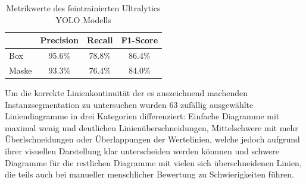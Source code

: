 \begin{table}[H]
    \centering
    \begin{tabular}{|l|c|c|c|}
        \hline
        \rowcolor[HTML]{EFEFEF}
              & Precision & Recall & F1-Score \\ \hline
        Box   & 95.6\%    & 78.8\% & 86.4\%   \\ \hline
        Maske & 93.3\%    & 76.4\% & 84.0\%   \\ \hline
    \end{tabular}
    \caption{Metrikwerte des feintrainierten Ultralytics YOLO Modells}
\end{table}

Um die korrekte Linienkontinuität der es auszeichnend machenden Instanzsegmentation zu untersuchen wurden 63 zufällig ausgewählte Liniendiagramme in drei Kategorien differenziert: Einfache Diagramme mit maximal wenig und deutlichen Linienüberschneidungen, Mittelschwere mit mehr Überlschneidungen oder Überlappungen der Wertelinien, welche jedoch aufgrund ihrer visuellen Darstellung klar unterscheiden werden könnnen und schwere Diagramme für die restlichen Diagramme mit vielen sich überschneidenen Linien, die teils auch bei manueller menschlicher Bewertung zu Schwierigkeiten führen.

